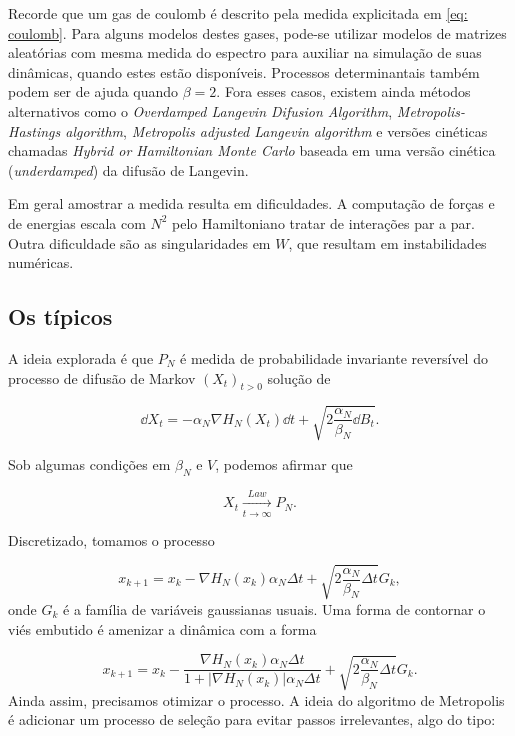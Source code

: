 Recorde que um gas de coulomb é descrito pela medida explicitada em \ref{eq: coulomb}. Para alguns modelos destes gases, pode-se utilizar modelos de matrizes aleatórias com mesma medida do espectro para auxiliar na simulação de suas dinâmicas, quando estes estão disponíveis. Processos determinantais também podem ser de ajuda quando $\beta = 2$. Fora esses casos, existem ainda métodos alternativos como o \textit{Overdamped Langevin Difusion Algorithm}, \textit{Metropolis-Hastings algorithm}, \textit{Metropolis adjusted Langevin algorithm} e versões cinéticas chamadas \textit{Hybrid or Hamiltonian Monte Carlo} baseada em uma versão cinética (\textit{underdamped}) da difusão de Langevin.

Em geral amostrar a medida resulta em dificuldades. A computação de forças e de energias escala com $N^2$ pelo Hamiltoniano tratar de interações par a par. Outra dificuldade são as singularidades em $W$, que resultam em instabilidades numéricas.

\subsection{Os típicos}

A ideia explorada é que $P_N$ é medida de probabilidade invariante reversível do processo de difusão de Markov $(X_t)_{t>0}$ solução de

\[
\dd X_t = -\alpha_N \nabla H_N(X_t) \dd t + \sqrt{2\frac{\alpha_N}{\beta_N} \dd B_t}.
\]

Sob algumas condições em $\beta_N$ e $V$, podemos afirmar que

\[
X_t \xrightarrow[t \rightarrow \infty]{Law} P_N.
\]

Discretizado, tomamos o processo

\[
x_{k+1} = x_k - \nabla H_N(x_k) \alpha_N \Delta t + \sqrt{2\frac{\alpha_N}{\beta_N} \Delta t} G_k,
\]
onde $G_k$ é a família de variáveis gaussianas usuais. Uma forma de contornar o viés embutido é amenizar a dinâmica com a forma

\[
x_{k+1} = x_k - \frac{\nabla H_N(x_k) \alpha_N \Delta t}{1 + |\nabla H_N(x_k)| \alpha_N \Delta t} + \sqrt{2\frac{\alpha_N}{\beta_N} \Delta t} G_k.
\]
Ainda assim, precisamos otimizar o processo. A ideia do algoritmo de Metropolis é adicionar um processo de seleção para evitar passos irrelevantes, algo do tipo:

